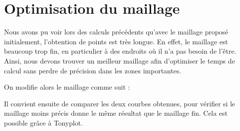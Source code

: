 \documentclass[a4paper,11pt]{report}
\begin{document}
\noindent{}


\section{Optimisation du maillage}

Nous avons pu voir lors des calculs précédents qu'avec le maillage proposé initialement, l'obtention de points est très longue. En effet, le maillage est beaucoup trop fin, en particulier à des endroits où il n'a pas besoin de l'être. Ainsi, nous devons trouver un meilleur maillage afin d'optimiser le temps de calcul sans perdre de précision dans les zones importantes. 

On modifie alors le maillage comme suit :


Il convient ensuite de comparer les deux courbes obtenues, pour vérifier si le maillage moins précis donne le même résultat que le maillage fin. Cela est possible grâce à Tonyplot.
\end{document}
